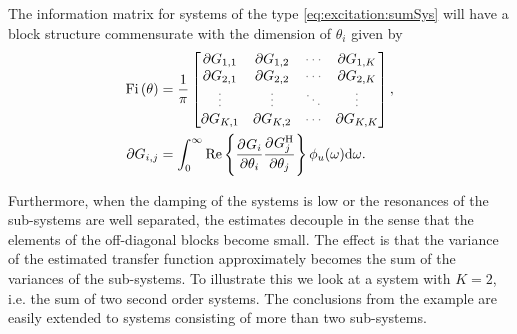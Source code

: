 The information matrix for systems of the type \eqref{eq:excitation:sumSys} will have a block structure commensurate with the dimension of $\theta_i$ given by
\begin{align}
\Fi{\theta} &= \frac{1}{\pi}
\begin{bmatrix}
  \partial G_{1,1}        &\partial G_{1,2}       &\deemph{\cdots}         &\partial G_{1,K}\\
  \partial G_{2,1}        &\partial G_{2,2}       &\deemph{\cdots}         &\partial G_{2,K}\\
  \deemph{\vdots}                  &\deemph{\vdots}                 &\deemph{\ddots}         &\deemph{\vdots}          \\
  \partial G_{K,1}        &\partial G_{K,2}       &\deemph{\cdots}         &\partial G_{K,K}
\end{bmatrix},\\
\partial G_{i,j} &= \int_0^\infty
                      \RealPart\left\{
                          \PartialDerivative{G_i}
                               {\theta_i}
                          \PartialDerivative{G_j^{\HT}}
                               {\theta_j}
                                \right\}
                      \phi_u(\omega)\dd\omega.
\end{align}

Furthermore, when the damping of the systems is low or the resonances of the sub-systems are well separated, the estimates decouple in the sense that the elements of the off-diagonal blocks become small.
The effect is that the variance of the estimated transfer function approximately becomes the sum of the variances of the sub-systems.
To illustrate this we look at a system with $K=2$, i.e. the sum of two second order systems.
The conclusions from the example are easily extended to systems consisting of more than two sub-systems.

